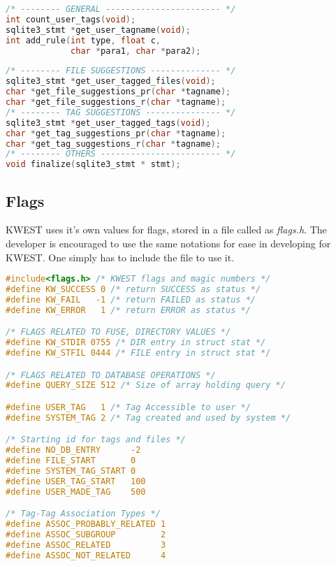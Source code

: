 \begin{lstlisting}[language=C,frame=single]
/* -------- GENERAL ----------------------- */
int count_user_tags(void);
sqlite3_stmt *get_user_tagname(void);
int add_rule(int type, float c, 
             char *para1, char *para2);
             \end{lstlisting}
\begin{lstlisting}[language=C,frame=single]
/* -------- FILE SUGGESTIONS -------------- */
sqlite3_stmt *get_user_tagged_files(void);
char *get_file_suggestions_pr(char *tagname);
char *get_file_suggestions_r(char *tagname);
/* -------- TAG SUGGESTIONS --------------- */
sqlite3_stmt *get_user_tagged_tags(void);
char *get_tag_suggestions_pr(char *tagname);
char *get_tag_suggestions_r(char *tagname);
/* -------- OTHERS ------------------------ */
void finalize(sqlite3_stmt * stmt);
\end{lstlisting}

\subsection{Flags}
KWEST uses it's own values for flags, stored in a file called as \textit{flags.h}. The developer is encouraged to use the same notations for ease in developing for KWEST. One simply has to include the file to use it.
\begin{lstlisting}[language=C,frame=single]
#include<flags.h> /* KWEST flags and magic numbers */
#define KW_SUCCESS 0 /* return SUCCESS as status */
#define KW_FAIL   -1 /* return FAILED as status */
#define KW_ERROR   1 /* return ERROR as status */

/* FLAGS RELATED TO FUSE, DIRECTORY VALUES */
#define KW_STDIR 0755 /* DIR entry in struct stat */
#define KW_STFIL 0444 /* FILE entry in struct stat */

/* FLAGS RELATED TO DATABASE OPERATIONS */
#define QUERY_SIZE 512 /* Size of array holding query */

#define USER_TAG   1 /* Tag Accessible to user */
#define SYSTEM_TAG 2 /* Tag created and used by system */

/* Starting id for tags and files */
#define NO_DB_ENTRY      -2
#define FILE_START       0
#define SYSTEM_TAG_START 0
#define USER_TAG_START   100
#define USER_MADE_TAG    500

/* Tag-Tag Association Types */
#define ASSOC_PROBABLY_RELATED 1
#define ASSOC_SUBGROUP         2
#define ASSOC_RELATED          3
#define ASSOC_NOT_RELATED      4
\end{lstlisting}

